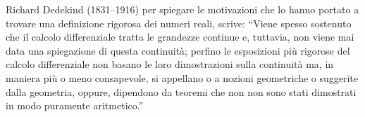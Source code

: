 \label{nota:Dedekind}
%
Richard Dedekind (1831--1916) per spiegare
le motivazioni che lo hanno portato a trovare una 
definizione rigorosa dei numeri reali,
scrive:
``Viene spesso sostenuto che il calcolo differenziale 
tratta le grandezze continue e, 
tuttavia, non viene mai data una spiegazione 
di questa continuità; perfino le esposizioni 
più rigorose del calcolo differenziale non basano
le loro dimostrazioni sulla continuità ma, 
in maniera più o meno consapevole, si appellano o 
a nozioni geometriche o suggerite dalla geometria,
oppure, dipendono da teoremi che non 
non sono stati dimostrati in modo 
puramente aritmetico.''